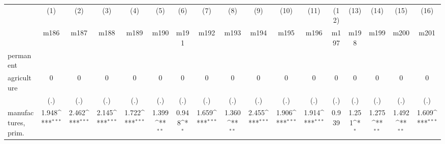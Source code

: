 {
\def\sym#1{\ifmmode^{#1}\else\(^{#1}\)\fi}
\begin{tabular}{l*{16}{c}}
\hline\hline
                    &\multicolumn{1}{c}{(1)}&\multicolumn{1}{c}{(2)}&\multicolumn{1}{c}{(3)}&\multicolumn{1}{c}{(4)}&\multicolumn{1}{c}{(5)}&\multicolumn{1}{c}{(6)}&\multicolumn{1}{c}{(7)}&\multicolumn{1}{c}{(8)}&\multicolumn{1}{c}{(9)}&\multicolumn{1}{c}{(10)}&\multicolumn{1}{c}{(11)}&\multicolumn{1}{c}{(12)}&\multicolumn{1}{c}{(13)}&\multicolumn{1}{c}{(14)}&\multicolumn{1}{c}{(15)}&\multicolumn{1}{c}{(16)}\\
                    &\multicolumn{1}{c}{m186}&\multicolumn{1}{c}{m187}&\multicolumn{1}{c}{m188}&\multicolumn{1}{c}{m189}&\multicolumn{1}{c}{m190}&\multicolumn{1}{c}{m191}&\multicolumn{1}{c}{m192}&\multicolumn{1}{c}{m193}&\multicolumn{1}{c}{m194}&\multicolumn{1}{c}{m195}&\multicolumn{1}{c}{m196}&\multicolumn{1}{c}{m197}&\multicolumn{1}{c}{m198}&\multicolumn{1}{c}{m199}&\multicolumn{1}{c}{m200}&\multicolumn{1}{c}{m201}\\
\hline
permanent           &                     &                     &                     &                     &                     &                     &                     &                     &                     &                     &                     &                     &                     &                     &                     &                     \\
agriculture         &           0         &           0         &           0         &           0         &           0         &           0         &           0         &           0         &           0         &           0         &           0         &           0         &           0         &           0         &           0         &           0         \\
                    &         (.)         &         (.)         &         (.)         &         (.)         &         (.)         &         (.)         &         (.)         &         (.)         &         (.)         &         (.)         &         (.)         &         (.)         &         (.)         &         (.)         &         (.)         &         (.)         \\
[1em]
manufactures, prim. &       1.948\sym{***}&       2.462\sym{***}&       2.145\sym{***}&       1.722\sym{***}&       1.399\sym{**} &       0.948\sym{*}  &       1.659\sym{***}&       1.360\sym{**} &       2.455\sym{***}&       1.906\sym{***}&       1.914\sym{***}&       0.939         &       1.251\sym{*}  &       1.275\sym{**} &       1.492\sym{**} &       1.609\sym{***}\\

\end{tabular}}
